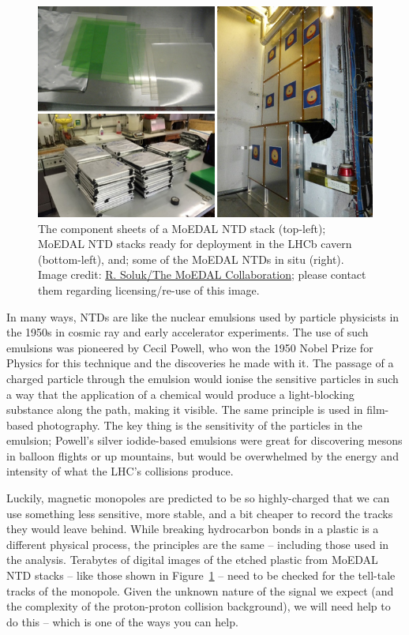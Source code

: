%
\begin{figure}[htbp]
  \centering
  \includegraphics[width=1.0\textwidth]{assets/images/ntd/ntd.jpg}
  \caption[The MoEDAL Nuclear Track Detectors]
  {\label{fig:ntd}The component sheets of a MoEDAL \acf{NTD} stack (top-left); %
\ac{MoEDAL} \ac{NTD} stacks ready for deployment in the \ac{LHCb} cavern (bottom-left), %
and; some of the \ac{MoEDAL} \acp{NTD} in situ (right).  %
Image credit: \href{http://moedal.web.cern.ch}{R. Soluk/The MoEDAL Collaboration}; please contact them regarding licensing/re-use of this image.}
\end{figure}
%

In many ways, \acp{NTD} are like the nuclear emulsions used by particle
physicists in the 1950s in cosmic ray and early accelerator experiments.
The use of such emulsions was pioneered by Cecil Powell,
who won the 1950 Nobel Prize for Physics for this technique and the
discoveries he made with it.
%
The passage of a charged particle through the emulsion would ionise the
sensitive particles in such a way that the application of a chemical
would produce a light-blocking substance along the path,
making it visible.
The same principle is used in film-based photography.
The key thing is the sensitivity of the particles in the emulsion;
Powell's silver iodide-based emulsions were great for discovering mesons
in balloon flights or up mountains,
but would be overwhelmed by the energy and intensity of what the
LHC's collisions produce.

Luckily, magnetic monopoles are predicted to be so highly-charged
that we can use something less sensitive, more stable, and a bit cheaper
to record the tracks they would leave behind.
While breaking hydrocarbon bonds in a plastic is a different physical process,
the principles are the same -- including those used in the analysis.
Terabytes of digital images of the etched plastic from \ac{MoEDAL} \ac{NTD}
stacks -- like those shown in Figure~\ref{fig:ntd} -- need to be checked
for the tell-tale tracks of the monopole.
Given the unknown nature of the signal we expect (and the complexity of the
proton-proton collision background),
we will need help to do this -- which is one of the ways you can help.

